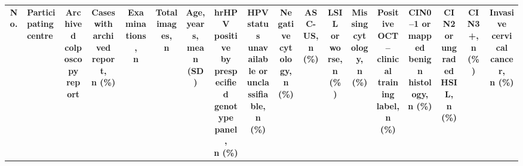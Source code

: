 \documentclass[11pt, a4paper]{article}
\theoremstyle{plain}
\theoremstyle{definition}
\begin{document}
\begin{landscape}
\begin{center}
  \begin{minipage}{1\linewidth}
    \captionsetup{type=table}
    \label{tab:baseline_all3000_5cens}
    \normalsize
    \setlength{\tabcolsep}{2pt}
    \renewcommand{\arraystretch}{1.8}
    \begin{adjustbox}{width=\linewidth}
    \begin{tabular}{c >{\raggedright\arraybackslash}p{4.2cm} c c c c *{12}{c}}
      \toprule
      \textbf{No.} & \textbf{Participating centre} & \makecell[c]{\textbf{Archived}\\ \textbf{colposcopy}\\ \textbf{report}} & \makecell[c]{\textbf{Cases with}\\ \textbf{archived report,}\\ \textbf{n (\%)}} & \makecell[c]{\textbf{Examinations,}\\ \textbf{n}} & \makecell[c]{\textbf{Total images,}\\ \textbf{n}} & \makecell[c]{\textbf{Age, years,}\\ \textbf{mean (SD)}} & \makecell[c]{\textbf{hrHPV positive}\\ \textbf{by prespecified}\\ \textbf{genotype panel,}\\ \textbf{n (\%)}} & \makecell[c]{\textbf{HPV status}\\ \textbf{unavailable or}\\ \textbf{unclassifiable,}\\ \textbf{n (\%)}} & \makecell[c]{\textbf{Negative}\\ \textbf{cytology,}\\ \textbf{n (\%)}} & \makecell[c]{\textbf{ASC-US,}\\ \textbf{n (\%)}} & \makecell[c]{\textbf{LSIL or}\\ \textbf{worse,}\\ \textbf{n (\%)}} & \makecell[c]{\textbf{Missing}\\ \textbf{cytology,}\\ \textbf{n (\%)}} & \makecell[c]{\textbf{Positive}\\ \textbf{OCT--clinical}\\ \textbf{training label,}\\ \textbf{n (\%)}} & \makecell[c]{\textbf{CIN0--1 or}\\ \textbf{mapped benign}\\ \textbf{histology,}\\ \textbf{n (\%)}} & \makecell[c]{\textbf{CIN2 or}\\ \textbf{ungraded}\\ \textbf{HSIL,}\\ \textbf{n (\%)}} & \makecell[c]{\textbf{CIN3+,}\\ \textbf{n (\%)}} & \makecell[c]{\textbf{Invasive}\\ \textbf{cervical cancer,}\\ \textbf{n (\%)}} \\

\end{tabular}
\end{adjustbox}
\end{minipage}
\end{center}
\end{landscape}
\end{document}
